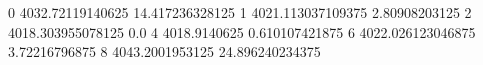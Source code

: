 0 4032.72119140625 14.417236328125
1 4021.113037109375 2.80908203125
2 4018.303955078125 0.0
4 4018.9140625 0.610107421875
6 4022.026123046875 3.72216796875
8 4043.2001953125 24.896240234375
